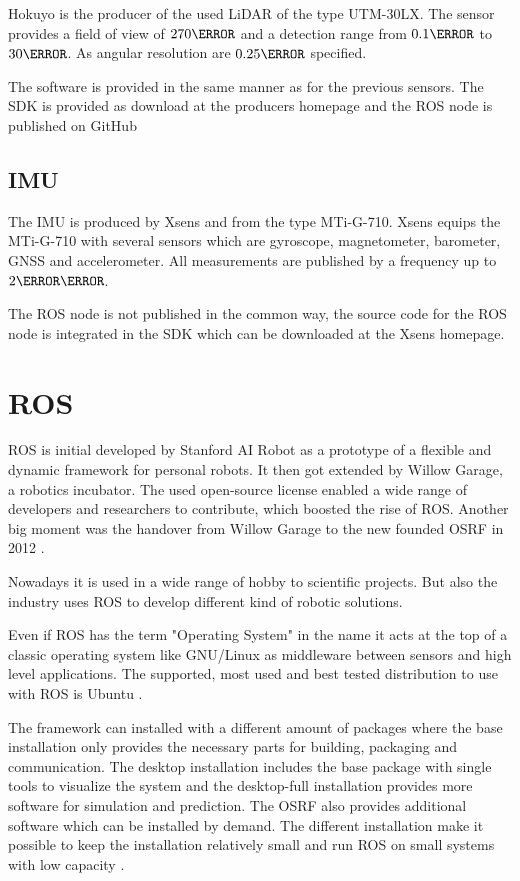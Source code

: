 Hokuyo is the producer of the used \ac{LiDAR} of the type UTM-30LX.
The sensor provides a field of view of $270\degree$ and a detection range from $0.1\meter$ to $30\meter$.
As angular resolution are $0.25\degree$ specified\cite{UTM-30LX}.

The software is provided in the same manner as for the previous sensors.
The \ac{SDK} is provided as download at the producers homepage and the ROS node is published on GitHub\cite{URG_node}

\subsection{IMU}\label{ssec:HWIMU}

The IMU is produced by Xsens and from the type MTi-G-710.
Xsens equips the MTi-G-710 with several sensors which are gyroscope, magnetometer, barometer, GNSS and accelerometer.
All measurements are published by a frequency up to $2\kilo\hertz$\cite{IMU}.

The ROS node is not published in the common way, the source code for the ROS node is integrated in the \ac{SDK} which can be downloaded at the Xsens homepage.

\section{ROS}\label{sec:ros}
\ac{ROS} is initial developed by Stanford AI Robot as a prototype of a flexible and dynamic framework for personal robots.
It then got extended by Willow Garage, a robotics incubator.
The used open-source license enabled a wide range of developers and researchers to contribute, which boosted the rise of \ac{ROS}.
Another big moment was the handover from Willow Garage to the new founded \ac{OSRF} in 2012 \cite{rosHistory}.

Nowadays it is used in a wide range of hobby to scientific projects.
But also the industry uses \ac{ROS} to develop different kind of robotic solutions.

Even if \ac{ROS} has the term "Operating System" in the name it acts at the top of a classic operating system like GNU/Linux as middleware between sensors and high level applications.
The supported, most used and best tested distribution to use with \ac{ROS} is Ubuntu \cite{rosInstallationOS}.

The framework can installed with a different amount of packages where the base installation only provides the necessary parts for building, packaging and communication.
The desktop installation includes the base package with single tools to visualize the system and the desktop-full installation provides more software for simulation and prediction.
The \ac{OSRF} also provides additional software which can be installed by demand.
The different installation make it possible to keep the installation relatively small and run \ac{ROS} on small systems with low capacity \cite{rosInstallations}.

